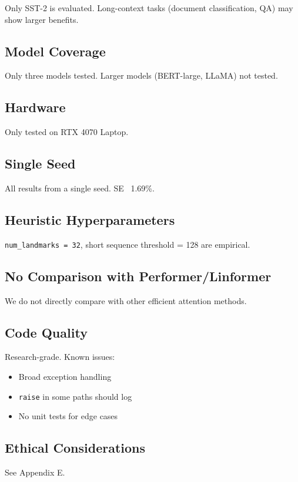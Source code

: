 Only SST-2 is evaluated. Long-context tasks (document classification, 
QA) may show larger benefits.

\subsection{Model Coverage}

Only three models tested. Larger models (BERT-large, LLaMA) not tested.

\subsection{Hardware}

Only tested on RTX 4070 Laptop.

\subsection{Single Seed}

All results from a single seed. SE ~1.69\%.

\subsection{Heuristic Hyperparameters}

\texttt{num\_landmarks = 32}, short sequence threshold = 128 are empirical.

\subsection{No Comparison with Performer/Linformer}

We do not directly compare with other efficient attention methods.

\subsection{Code Quality}

Research-grade. Known issues:
\begin{itemize}
\item Broad exception handling
\item \texttt{raise} in some paths should log
\item No unit tests for edge cases

\end{itemize}
\subsection{Ethical Considerations}

See Appendix E.

